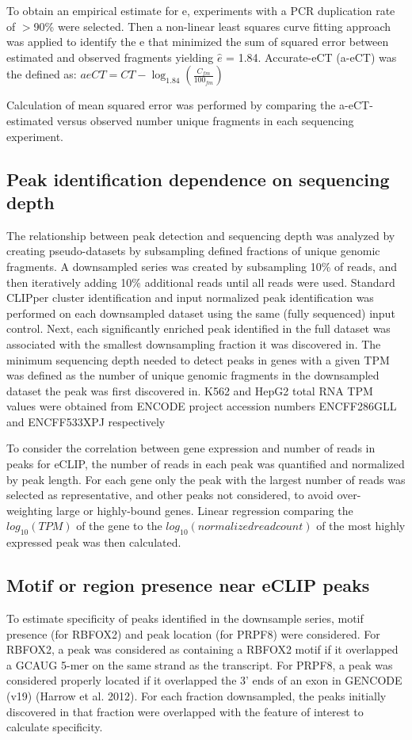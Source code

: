 To obtain an empirical estimate for e, experiments with a PCR duplication rate of $>$90\% were selected. Then a non-linear least squares curve fitting approach was applied to identify the e that minimized the sum of squared error between estimated and observed fragments yielding $\hat{e}$ = 1.84. Accurate-eCT (a-eCT) was the defined as: $aeCT=CT-\log_{1.84}(\frac{C_{fm}}{100_{fm}})$

Calculation of mean squared error was performed by comparing the a-eCT-estimated versus observed number unique fragments in each sequencing experiment.

\subsection{Peak identification dependence on sequencing depth}
The relationship between peak detection and sequencing depth was analyzed by creating pseudo-datasets by subsampling defined fractions of unique genomic fragments. A downsampled series was created by subsampling 10\% of reads, and then iteratively adding 10\% additional reads until all reads were used. Standard CLIPper cluster identification and input normalized peak identification was performed on each downsampled dataset using the same (fully sequenced) input control. Next, each significantly enriched peak identified in the full dataset was associated with the smallest downsampling fraction it was discovered in.
The minimum sequencing depth needed to detect peaks in genes with a given TPM was defined as the number of unique genomic fragments in the downsampled dataset the peak was first discovered in. K562 and HepG2 total RNA TPM values were obtained from ENCODE project accession numbers ENCFF286GLL and ENCFF533XPJ respectively

To consider the correlation between gene expression and number of reads in peaks for eCLIP, the number of reads in each peak was quantified and normalized by peak length. For each gene only the peak with the largest number of reads was selected as representative, and other peaks not considered, to avoid over-weighting large or highly-bound genes. Linear regression comparing the $log_{10}(TPM)$ of the gene to the $log_{10}(normalized read count)$ of the most highly expressed peak was then calculated.

\subsection{Motif or region presence near eCLIP peaks}
To estimate specificity of peaks identified in the downsample series, motif presence (for RBFOX2) and peak location (for PRPF8) were considered. For RBFOX2, a peak was considered as containing a RBFOX2 motif if it overlapped a GCAUG 5-mer on the same strand as the transcript. For PRPF8, a peak was considered properly located if it overlapped the 3’ ends of an exon in GENCODE (v19) (Harrow et al. 2012). For each fraction downsampled, the peaks initially discovered in that fraction were overlapped with the feature of interest to calculate specificity.

